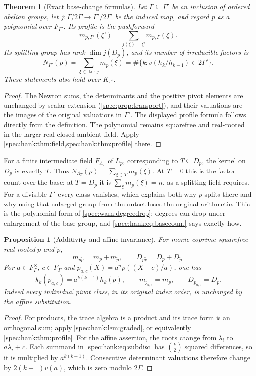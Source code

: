 \documentclass[11pt,a4paper]{article}
\numberwithin{equation}{section}
\newtheorem{theorem}{Theorem}[section]
\newtheorem{proposition}[proposition]{Proposition}
\theoremstyle{definition}
\theoremstyle{remark}
\begin{document}
\begin{theorem}[Exact base-change formulas]\label{spec:hank:thm:basechange}
Let $\Gamma\subseteq\Gamma'$ be an inclusion of ordered abelian groups, let
$j:\Gamma/2\Gamma\to\Gamma'/2\Gamma'$ be the induced map, and regard $p$ as a
polynomial over $F_{\Gamma'}$. Its profile is the pushforward
\[
 m_{p,\Gamma'}(\xi')=\sum_{j(\xi)=\xi'}m_{p,\Gamma}(\xi).
\]
Its splitting group has rank $\dim j(D_p)$, and its number of irreducible
factors is
\begin{equation}\label{spec:hank:eq:basecount}
 N_{\Gamma'}(p)=\sum_{\xi\in\ker j}m_p(\xi)
       =\#\{k:v(h_k/h_{k-1})\in2\Gamma'\}.
\end{equation}
These statements also hold over $K_{\Gamma'}$.
\end{theorem}
\begin{proof}
The Newton sums, the determinants and the positive pivot elements are
unchanged by scalar extension (\cref{spec:prop:transport}), and their
valuations are the images of the original valuations in $\Gamma'$. The
displayed profile formula follows directly from the definition. The
polynomial remains squarefree and real-rooted in the larger real closed
ambient field. Apply \cref{spec:hank:thm:field,spec:hank:thm:profile} there.
\end{proof}

For a finite intermediate field $F_{\Lambda_T}$ of $L_p$, corresponding to
$T\subseteq D_p$, the kernel on $D_p$ is exactly $T$. Thus
$N_{\Lambda_T}(p)=\sum_{\xi\in T}m_p(\xi)$. At $T=0$ this is the factor count
over the base; at $T=D_p$ it is $\sum_\xi m_p(\xi)=n$, as a splitting field
requires. For a divisible $\Gamma'$ every class vanishes, which explains both
why $p$ splits there and why using that enlarged group from the outset loses
the original arithmetic. This is the polynomial form of
\cref{spec:warn:degreedrop}: degrees can drop under enlargement of the base
group, and \eqref{spec:hank:eq:basecount} says exactly how.

\begin{proposition}[Additivity and affine invariance]\label{spec:hank:prop:invariance}
For monic coprime squarefree real-rooted $p$ and $\tilde p$,
\[
 m_{p\tilde p}=m_p+m_{\tilde p},\qquad D_{p\tilde p}=D_p+D_{\tilde p}.
\]
For $a\in F_\Gamma^\times$, $c\in F_\Gamma$ and
$p_{a,c}(X)=a^n p((X-c)/a)$, one has
\[
 h_k(p_{a,c})=a^{k(k-1)}h_k(p),\qquad
 m_{p_{a,c}}=m_p,\qquad D_{p_{a,c}}=D_p.
\]
Indeed every individual pivot class, in its original index order, is
unchanged by the affine substitution.
\end{proposition}
\begin{proof}
For products, the trace algebra is a product and its trace form is an
orthogonal sum; apply \cref{spec:hank:lem:graded}, or equivalently
\cref{spec:hank:thm:profile}. For the affine assertion, the roots change from
$\lambda_i$ to $a\lambda_i+c$. Each summand in \eqref{spec:hank:eq:subdisc}
has $\binom{k}{2}$ squared differences, so it is multiplied by $a^{k(k-1)}$.
Consecutive determinant valuations therefore change by $2(k-1)v(a)$, which is
zero modulo $2\Gamma$.
\end{proof}
\end{document}
